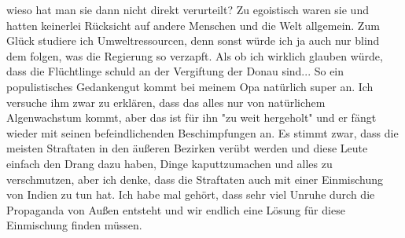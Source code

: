 \documentclass[twoside, a4paper, DIV=11, open=any, bibliography=totoc]{scrbook}
\begin{document}
wieso hat man sie dann nicht direkt verurteilt? Zu egoistisch waren sie und hatten
keinerlei Rücksicht auf
andere Menschen und die Welt allgemein. Zum Glück studiere ich Umweltressourcen,
denn sonst würde ich ja auch
nur blind dem folgen, was die Regierung so verzapft. Als ob ich wirklich glauben
würde, dass die Flüchtlinge
schuld an der Vergiftung der Donau sind... So ein populistisches Gedankengut kommt
bei meinem Opa natürlich
super an. Ich versuche ihm zwar zu erklären, dass das alles nur von natürlichem
Algenwachstum kommt, aber
das ist für ihn "zu weit hergeholt" und er fängt wieder mit seinen befeindlichenden
Beschimpfungen an.
Es stimmt zwar, dass die meisten Straftaten in den äußeren Bezirken verübt werden
und diese Leute einfach
den Drang dazu haben, Dinge kaputtzumachen und alles zu verschmutzen, aber ich
denke, dass die Straftaten auch
mit einer Einmischung von Indien zu tun hat. Ich habe mal gehört, dass sehr viel
Unruhe durch die Propaganda
von Außen entsteht und wir endlich eine Lösung für diese Einmischung finden müssen.
\end{document}
